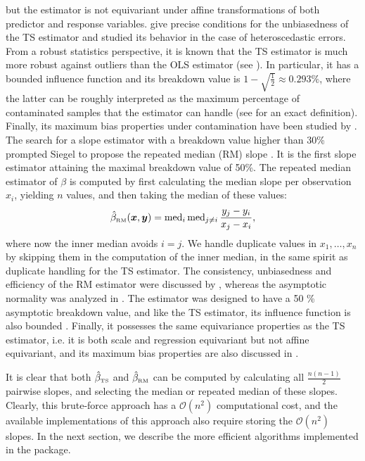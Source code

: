 but the estimator is not equivariant under affine transformations of both predictor and response variables. \cite{Wang2005} give precise conditions for the unbiasedness of the TS estimator and \citep{wilcox1998note} studied its behavior in the case of heteroscedastic errors. From a robust statistics perspective, it is known that the TS estimator is much more robust against outliers than the OLS estimator (see \cite{rousseeuw2005robust}). In particular, it has a bounded influence function \citep{Hampel:IFapproach} and its breakdown value is $1 - \sqrt{\frac{1}{2}} \approx 0.293 \%$, where the latter can be roughly interpreted as the maximum percentage of contaminated samples that the estimator can handle (see \cite{Donoho:BDP} for an exact definition). Finally, its maximum bias properties under contamination have been studied by \cite{adrover2004bias}.\\

The search for a slope estimator with a breakdown value higher than 30\% prompted Siegel to propose the repeated median (RM) slope \citep{siegel1982robust}. It is the first slope estimator attaining the maximal breakdown value of 50\%. The repeated median estimator of $\beta$ is computed by first calculating the median slope per observation $x_i$, yielding $n$ values, and then taking the median of these values:
\begin{equation*}
\betahRM(\bx,\by)=\med_i \med_{j\neq i} \frac{y_j - y_i}{x_j - x_i},
\end{equation*}
where now the inner median avoids $i=j$. We handle duplicate values in $x_1,\ldots,x_n$ by skipping them in the computation of the inner median, in the same spirit as duplicate handling for the TS estimator. The consistency, unbiasedness and efficiency of the RM estimator were discussed by \cite{siegel1982robust}, whereas the asymptotic normality was analyzed in \cite{hossjer1994asymptotics}. The estimator was designed to have a 50 \% asymptotic breakdown value, and like the TS estimator, its influence function is also bounded \citep{rousseeuw1992new, rousseeuw1995sensitivity, rousseeuw2005robust}. Finally, it possesses the same equivariance properties as the TS estimator, i.e. it is both scale and regression equivariant but not affine equivariant, and its maximum bias properties are also discussed in \cite{adrover2004bias}.\par

It is clear that both $\hat{\beta}_{ \mbox{\tiny TS}}$ and $\hat{\beta}_{\mbox{\tiny RM}}$ can be computed by calculating all $\frac{n(n-1)}{2}$ pairwise slopes, and selecting the median or repeated median of these slopes. Clearly, this brute-force approach has a $\mathcal{O}(n^2)$ computational cost, and the available implementations of this approach also require storing the $\mathcal{O}(n^2)$ slopes. In the next section, we describe the more efficient algorithms implemented in the  package.



